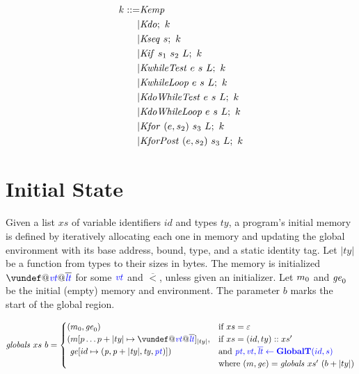 \documentclass[acmsmall,review,anonymous]{acmart}\settopmatter{printfolios=true,printccs=false,printacmref=false}
\begin{document}
\[\begin{split}
k ::= & \mathit{Kemp} \\
| & \mathit{Kdo};~ k \\
| & \mathit{Kseq} ~ s; ~ k \\
| & \mathit{Kif} ~ s_1 ~ s_2 ~ L; ~ k \\
| & \mathit{KwhileTest} ~ e ~ s ~ L; ~ k \\
| & \mathit{KwhileLoop} ~ e ~ s ~ L; ~ k \\
| & \mathit{KdoWhileTest} ~ e ~ s ~ L; ~ k \\
| & \mathit{KdoWhileLoop} ~ e ~ s ~ L; ~ k \\
| & \mathit{Kfor} ~ (e,s_2) ~ s_3 ~ L ; ~ k \\
| & \mathit{KforPost} ~ (e,s_2) ~ s_3 ~ L ; ~ k \\
\end{split}\]

\section{Initial State}

Given a list \(xs\) of variable identifiers \(id\) and types
\(ty\), a program's initial memory is defined by iteratively allocating each one
in memory and updating the global environment with its base address, bound, type,
and a static identity tag. Let \(|ty|\) be a function from types to their sizes
in bytes. The memory is initialized \(\vundef@\vt@\overline{\lt}\)
for some \(\mathit{\color{blue} vt}\) and \(\overline{\lt}\), unless given an initializer.
Let \(m_0\) and \(\mathit{ge}_0\) be the initial (empty) memory and environment.
The parameter \(b\) marks the start of the global region.


\[\mathit{globals} ~ xs ~ b =
\begin{cases}
  (\mem_0, \genv_0) & \textnormal{if } xs = \varepsilon \\
  (\mem[p \dots p+|ty| \mapsto \vundef@\vt@\overline{\lt}]_{|ty|}, & \textnormal{if } xs = (id,ty)::xs' \\
  ~ \genv[id \mapsto (\mathit{p, p+|ty|,ty,\pt})]) & \textnormal{and } \trule{\globaltres}{\globalt} \\
  & \textnormal{where } (\mem,\genv) = \mathit{globals} ~ xs' ~ (b + |ty|) \\
\end{cases}\]
\end{document}
